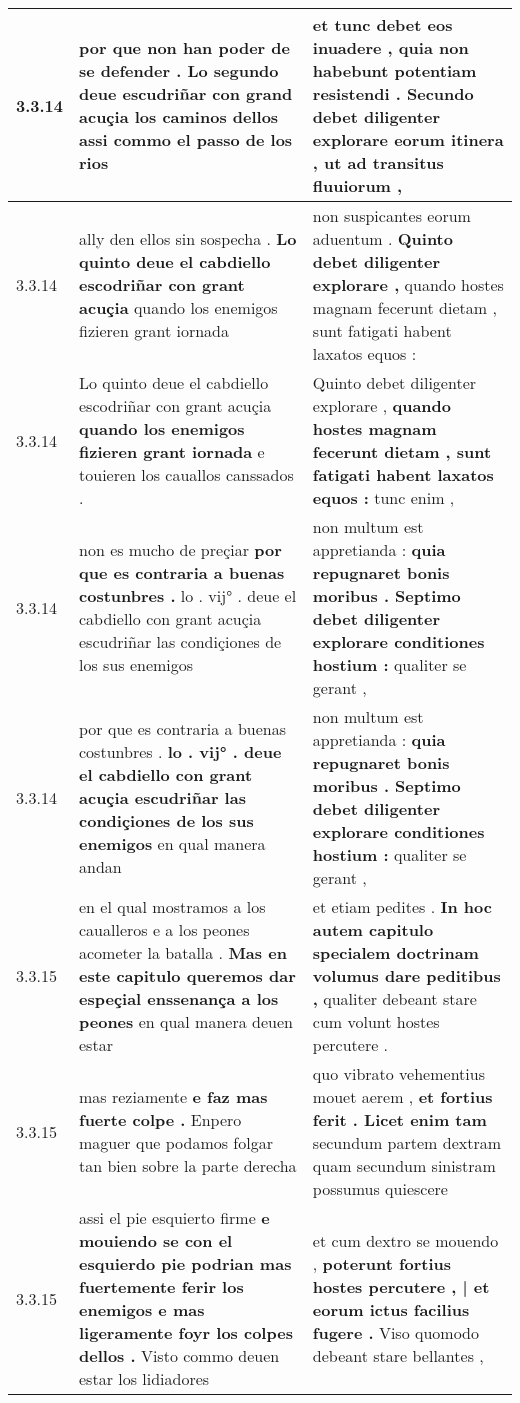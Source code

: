 \begin{tabular}{|p{1cm}|p{6.5cm}|p{6.5cm}|}
3.3.14 & por que non han poder de se defender . \textbf{ Lo segundo deue escudriñar con grand acuçia los caminos dellos } assi commo el passo de los rios & et tunc debet eos inuadere , \textbf{ quia non habebunt potentiam resistendi . Secundo debet diligenter explorare eorum itinera , } ut ad transitus fluuiorum , \\\hline
3.3.14 & ally den ellos sin sospecha . \textbf{ Lo quinto deue el cabdiello escodriñar con grant acuçia } quando los enemigos fizieren grant iornada & non suspicantes eorum aduentum . \textbf{ Quinto debet diligenter explorare , } quando hostes magnam fecerunt dietam , sunt fatigati habent laxatos equos : \\\hline
3.3.14 & Lo quinto deue el cabdiello escodriñar con grant acuçia \textbf{ quando los enemigos fizieren grant iornada } e touieren los cauallos canssados . & Quinto debet diligenter explorare , \textbf{ quando hostes magnam fecerunt dietam , sunt fatigati habent laxatos equos : } tunc enim , \\\hline
3.3.14 & non es mucho de preçiar \textbf{ por que es contraria a buenas costunbres . } lo . vij° . deue el cabdiello con grant acuçia escudriñar las condiçiones de los sus enemigos & non multum est appretianda : \textbf{ quia repugnaret bonis moribus . Septimo debet diligenter explorare conditiones hostium : } qualiter se gerant , \\\hline
3.3.14 & por que es contraria a buenas costunbres . \textbf{ lo . vij° . deue el cabdiello con grant acuçia escudriñar las condiçiones de los sus enemigos } en qual manera andan & non multum est appretianda : \textbf{ quia repugnaret bonis moribus . Septimo debet diligenter explorare conditiones hostium : } qualiter se gerant , \\\hline
3.3.15 & en el qual mostramos a los caualleros e a los peones acometer la batalla . \textbf{ Mas en este capitulo queremos dar espeçial enssenança a los peones } en qual manera deuen estar & et etiam pedites . \textbf{ In hoc autem capitulo specialem doctrinam volumus dare peditibus , } qualiter debeant stare cum volunt hostes percutere . \\\hline
3.3.15 & mas reziamente \textbf{ e faz mas fuerte colpe . } Enpero maguer que podamos folgar tan bien sobre la parte derecha & quo vibrato vehementius mouet aerem , \textbf{ et fortius ferit . Licet enim tam } secundum partem dextram quam secundum sinistram possumus quiescere \\\hline
3.3.15 & assi el pie esquierto firme \textbf{ e mouiendo se con el esquierdo pie podrian mas fuertemente ferir los enemigos e mas ligeramente foyr los colpes dellos . } Visto commo deuen estar los lidiadores & et cum dextro se mouendo , \textbf{ poterunt fortius hostes percutere , | et eorum ictus facilius fugere . } Viso quomodo debeant stare bellantes , \\\hline

\end{tabular}
